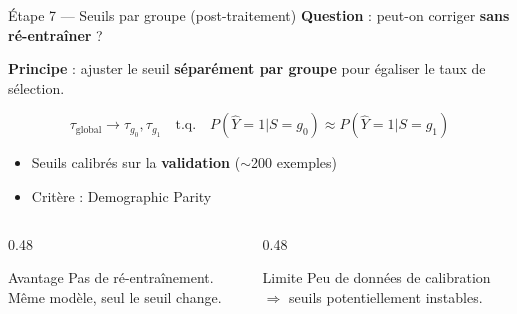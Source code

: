 \documentclass[aspectratio=169, 11pt]{beamer}
\begin{document}
\begin{frame}{\'Etape 7 --- Seuils par groupe (post-traitement)}
\textbf{Question} : peut-on corriger \textbf{sans r\'e-entra\^iner} ?

\vspace{0.5em}
\textbf{Principe} : ajuster le seuil \textbf{s\'epar\'ement par groupe} pour \'egaliser le taux de s\'election.

$$\tau_{\text{global}} \to \tau_{g_0}, \tau_{g_1} \quad\text{t.q.}\quad P(\hat{Y}{=}1|S{=}g_0) \approx P(\hat{Y}{=}1|S{=}g_1)$$

\begin{itemize}
    \item Seuils calibr\'es sur la \textbf{validation} ($\sim$200 exemples)
    \item Crit\`ere : Demographic Parity
\end{itemize}

\vspace{0.5em}
\begin{columns}[T]
\begin{column}{0.48\textwidth}
\begin{exampleblock}{Avantage}
Pas de r\'e-entra\^inement. M\^eme mod\`ele, seul le seuil change.
\end{exampleblock}
\end{column}
\begin{column}{0.48\textwidth}
\begin{alertblock}{Limite}
Peu de donn\'ees de calibration $\Rightarrow$ seuils potentiellement instables.
\end{alertblock}
\end{column}
\end{columns}
\end{frame}
\end{document}

